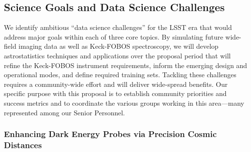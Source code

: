 \documentclass[oneside,11pt]{amsart}
\newcommand{\comment}[2][todo]{{\color{#1}[[{\bf #2}]]}}
\begin{document}



\subsection{Science Goals and Data Science Challenges}
\label{sec:goals}

We identify ambitious ``data science challenges'' for the LSST era that would address major goals within each of three
core topics.  By simulating future wide-field imaging data as well as Keck-FOBOS spectroscopy, we will develop
astrostatistics techniques and applications over the proposal period that will refine the Keck-FOBOS instrument
requirements, inform the emerging design and operational modes, and define required training sets.  Tackling these
challenges requires a community-wide effort and will deliver wide-spread benefits.  Our specific purpose with this
proposal is to establish community priorities and success metrics and to coordinate the various groups working in this
area---many represented among our Senior Personnel.

\subsubsection{Enhancing Dark Energy Probes via Precision Cosmic Distances}
\label{sec:cosmology}
\end{document}
